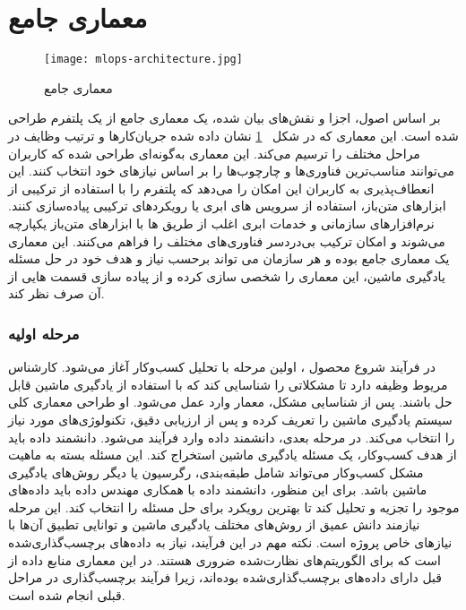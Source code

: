 \section{معماری جامع}
\begin{figure}[!b]
	\centering
	\texttt{[image: mlops-architecture.jpg]}
	\caption{معماری جامع }
	\label{fig: mlops architecture}
\end{figure}
بر اساس اصول، اجزا و نقش‌های بیان شده، یک معماری جامع از یک پلتفرم  طراحی شده است. این معماری که در شکل 
~\ref{fig: mlops architecture}
 نشان داده شده جریان‌کارها و ترتیب وظایف در مراحل مختلف را ترسیم می‌کند. این معماری به‌گونه‌ای طراحی شده که کاربران می‌توانند مناسب‌ترین فناوری‌ها و چارچوب‌ها را بر اساس نیازهای خود انتخاب کنند. این انعطاف‌پذیری به کاربران این امکان را می‌دهد که پلتفرم  را با استفاده از ترکیبی از ابزارهای متن‌باز، استفاده از سرویس های ابری  یا رویکردهای ترکیبی پیاده‌سازی کنند. نرم‌افزارهای سازمانی و خدمات ابری اغلب از طریق ‌ها با ابزارهای متن‌باز یکپارچه می‌شوند و امکان ترکیب بی‌دردسر فناوری‌های مختلف را فراهم می‌کنند. این معماری یک معماری جامع بوده و هر سازمان می تواند برحسب نیاز و هدف خود در حل مسئله یادگیری ماشین، این معماری را شخصی سازی کرده و از پیاده سازی قسمت هایی از آن صرف نظر کند.

\subsubsection{مرحله اولیه}
در فرآیند شروع محصول ، اولین مرحله با تحلیل کسب‌وکار آغاز می‌شود. کارشناس مریوط وظیفه دارد تا مشکلاتی را شناسایی کند که با استفاده از یادگیری ماشین قابل حل باشند. پس از شناسایی مشکل، معمار وارد عمل می‌شود. او طراحی معماری کلی سیستم یادگیری ماشین را تعریف کرده و پس از ارزیابی دقیق، تکنولوژی‌های مورد نیاز را انتخاب می‌کند. در مرحله بعدی، دانشمند داده وارد فرآیند می‌شود. دانشمند داده باید از هدف کسب‌وکار، یک مسئله یادگیری ماشین استخراج کند. این مسئله بسته به ماهیت مشکل کسب‌وکار می‌تواند شامل طبقه‌بندی، رگرسیون یا دیگر روش‌های یادگیری ماشین باشد. برای این منظور، دانشمند داده با همکاری مهندس داده باید داده‌های موجود را تجزیه و تحلیل کند تا بهترین رویکرد برای حل مسئله را انتخاب کند. این مرحله نیازمند دانش عمیق از روش‌های مختلف یادگیری ماشین و توانایی تطبیق آن‌ها با نیازهای خاص پروژه است. نکته مهم در این فرآیند، نیاز به داده‌های برچسب‌گذاری‌شده است که برای الگوریتم‌های نظارت‌شده ضروری هستند. در این معماری منابع داده از قبل دارای داده‌های برچسب‌گذاری‌شده بوده‌اند، زیرا فرآیند برچسب‌گذاری در مراحل قبلی انجام شده است.

